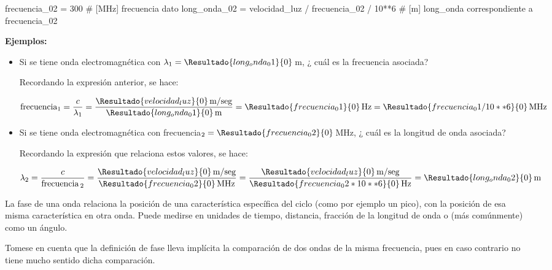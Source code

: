 \begin{description}
\begin{tcolorbox}
\begin{sagesilent}
frecuencia_02 = 300         # [MHz] frecuencia dato
long_onda_02  = velocidad_luz / frecuencia_02 / 10**6 # [m] long_onda correspondiente a frecuencia_02

  \end{sagesilent}

{\bf Ejemplos:}

  \begin{itemize}
  \item Si se tiene onda electromagn\'etica con $\lambda_1 =
    \Resultado{long_onda_01}{0}$\,m, ¿ cu\'al es la frecuencia
    asociada?

    Recordando la expresi\'on anterior, se hace:

    \[ \text{frecuencia}_1 = \displaystyle \frac{c}{\lambda_1} =
    \displaystyle
    \frac{\Resultado{velocidad_luz}{0}\text{\,m/seg}}{\Resultado{long_onda_01}{0}\text{\,m}}
    = \Resultado{frecuencia_01}{0}\,\text{Hz} =
    \Resultado{frecuencia_01 / 10**6}{0}\,\text{MHz}
    \]

  \item Si se tiene onda electromagn\'etica con frecuencia$_2 =
    \Resultado{frecuencia_02}{0}$\,MHz, ¿ cu\'al es la longitud de onda 
    asociada?

    Recordando la expresi\'on que relaciona estos valores, se hace:

\[ \displaystyle 
	\lambda_2 = \frac{c}{\text{frecuencia\,}_2} 
	= \frac{\Resultado{velocidad_luz}{0}\text{\,m/seg}}{\Resultado{frecuencia_02}{0}\text{\,MHz}}
	= \frac{\Resultado{velocidad_luz}{0}\text{\,m/seg}}{\Resultado{frecuencia_02 * 10**6 }{0}\text{\,Hz}}
	= \Resultado{long_onda_02}{0}\text{\,m}
\]

  \end{itemize}


 



\end{tcolorbox}


\item [Fase] La fase de una onda relaciona la posici\'on de una caracter\'istica espec\'ifica del ciclo (como por ejemplo un pico), con la posici\'on de esa misma caracter\'istica en otra onda. Puede medirse en unidades de tiempo, distancia, fracci\'on de la longitud de onda o (m\'as com\'unmente) como un \'angulo.

Tomese en cuenta que la definici\'on de fase lleva impl\'icita la comparaci\'on de dos ondas de la misma frecuencia, pues en caso contrario no tiene mucho sentido dicha comparaci\'on.


\end{description}
